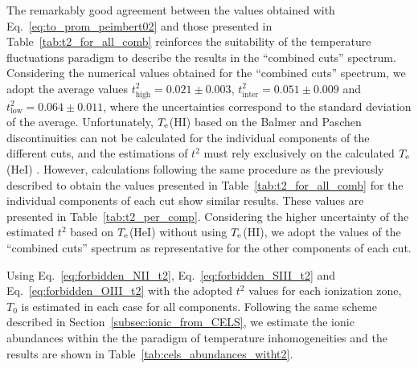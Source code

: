 \documentclass[fleqn,usenatbib]{mnras}
\begin{document}
The remarkably good agreement between the values obtained with  Eq.~\eqref{eq:to_prom_peimbert02} and those presented in Table~\ref{tab:t2_for_all_comb} reinforces the suitability of the temperature fluctuations paradigm to describe the results in the ``combined cuts'' spectrum. 
Considering the numerical values obtained for the ``combined cuts'' spectrum, we adopt the average values $t^2_{\text{high}}=0.021 \pm 0.003 $, $t^2_{\text{inter}}=0.051 \pm 0.009 $ and $t^2_{\text{low}}= 0.064 \pm 0.011$, where the uncertainties correspond to the standard deviation of the average. Unfortunately, $T_{\rm e}$(H\thinspace I)  based on the Balmer and Paschen discontinuities can not be calculated for the individual components of the different cuts, and the estimations of $t^2$ must rely exclusively on the calculated $T_{\rm e}$(He\thinspace I) . However, calculations following the same procedure as the previously described to obtain the values presented in Table~\ref{tab:t2_for_all_comb} for the individual components of each cut show similar results. These values are presented in Table~\ref{tab:t2_per_comp}. Considering the higher uncertainty of the estimated $t^2$ based on $T_{\rm e}$(He\thinspace I) without using $T_{\rm e}$(H\thinspace I), we adopt the values of the ``combined cuts'' spectrum as representative for the other components of each cut. 

Using Eq.~\eqref{eq:forbidden_NII_t2}, Eq.~\eqref{eq:forbidden_SIII_t2} and Eq.~\eqref{eq:forbidden_OIII_t2} with the adopted $t^2$ values for each ionization zone, $T_0$ is estimated in each case for all components. Following the same scheme described in Section~\ref{subsec:ionic_from_CELS}, we estimate the ionic abundances within the the paradigm of temperature inhomogeneities and the results are shown in Table~\ref{tab:cels_abundances_witht2}.
\end{document}
